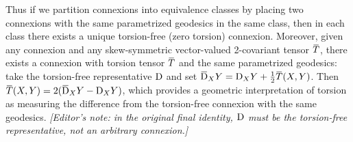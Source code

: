 \documentclass[../main]{subfiles}
\begin{document}
Thus if we partition connexions into equivalence classes by placing two connexions with the same parametrized geodesics in the same class, then in each class there exists a unique torsion-free (zero torsion) connexion. Moreover, given any connexion and any skew-symmetric vector-valued 2-covariant tensor $\xoverline T$, there exists a connexion with torsion tensor $\xoverline T$ and the same parametrized geodesics: take the torsion-free representative $\mathrm{D}$ and set $\covariant_XY=\connection_XY+\frac12\xoverline T(X,Y)$. Then $\xoverline T(X,Y)=2(\covariant_XY-\connection_XY)$, which provides a geometric interpretation of torsion as measuring the difference from the torsion-free connexion with the same geodesics. \emph{[Editor's note: in the original final identity, $\mathrm{D}$ must be the torsion-free representative, not an arbitrary connexion.]}
\end{document}

